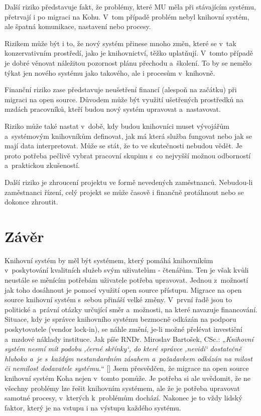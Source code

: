 \documentclass[
	11pt, oneside, printed, final, palatino, monochrome
	microtype,
	table,   %
	lof,     %
	lot     %
]{fithesis3}
\makeatletter
\newcommand{\citepages}[2]{[\cite[#1]{#2}]}
\newcommand{\citace}[1]{„\textit{#1}“} %
\makeatother
\begin{document}
{Další riziko představuje fakt, že problémy, které MU měla při stávajícím systému, přetrvají i po migraci na Kohu. V~tom případě problém nebyl knihovní systém, ale špatná komunikace, nastavení nebo procesy.

Rizikem může být i to, že nový systém přinese mnoho změn, které se v~tak konzervativním prostředí, jako je knihovnictví, těžko uplatňují. V~tomto případě je dobré věnovat náležitou pozornost plánu přechodu a~školení. To by se nemělo týkat jen nového systému jako takového, ale i procesům v~knihovně.

Finanční riziko zase představuje neušetření financí (alespoň na začátku) při migraci na open source. Důvodem může být využití ušetřených prostředků na mzdách pracovníků, kteří budou nový systém upravovat a~nastavovat. 

Riziko může také nastat v~době, kdy budou knihovníci muset vývojářům a~systémovým knihovníkům definovat, jak má která služba fungovat nebo jak se mají data interpretovat. Může se stát, že to ve skutečnosti nebudou vědět. Je proto potřeba pečlivě vybrat pracovní skupinu s~co nejvyšší možnou odborností a~praktickou zkušeností.

Další riziko je zhroucení projektu ve formě nevedených zaměstnanců. Nebudou-li zaměstnanci řízení, celý projekt se může časově i finančně protáhnout nebo se dokonce zhroutit.

\chapter*{Závěr}
Knihovní systém by měl být systémem, který pomáhá knihovníkům v~poskytování kvalitních služeb svým uživatelům - čtenářům. Ten je však kvůli neustále se měnícím potřebám uživatele potřeba upravovat. Jednou z~možností jak toho dosáhnout je pomocí využití open source přístupu. Migrace na open source knihovní systém s~sebou přináší velké změny. V~první řadě jsou to politické a~právní otázky určující směr a~možnosti, na které navazuje financování. Situace, kdy je správce knihovního systému bezmocně odkázán na podporu poskytovatele (vendor lock-in), se náhle změní, je-li možné přelévat investiční a~mzdové náklady instituce. Jak píše RNDr. Miroslav Bartošek, CSc.: \citace{Knihovní systém nesmí mít podobu ‚černé skřínky‘, do které správce ‚nevidí‘ dostatečně hluboko a~je s~každým nestandardním zásahem a~požadavkem odkázán na milost či nemilost dodavatele systému.} \citepages{3}{bartosek_2001_systemovy_pohled}
 Jsem přesvědčen, že migrace na open source knihovní systém Koha nejen v~tomto pomůže. Je potřeba si ale uvědomit, že ne všechny problémy lze řešit knihovním systémem, ale že je potřeba upravovat samotné procesy, v~kterých k~problémům dochází. Nakonec je to vždy lidský faktor, který je na vstupu i na výstupu každého systému. 
 
}
\end{document}
